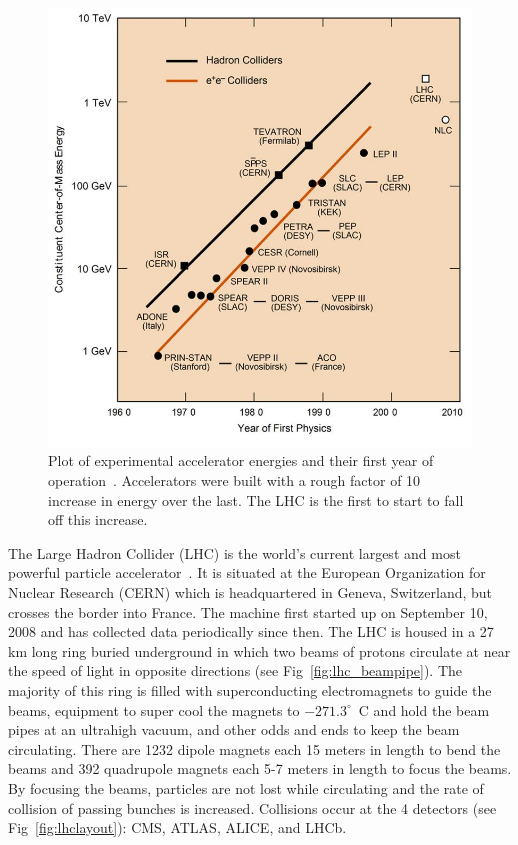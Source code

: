 		\begin{figure}[h]
		\begin{center}
\includegraphics[width=0.8\linewidth]{Figs/collider_energy.jpg}
\end{center}
\caption{\label{fig:experiment_energies}
Plot of experimental accelerator energies and their first year of operation~\cite{comenergy}. Accelerators were built with a rough factor of 10 increase in energy over the last. The LHC is the first to start to fall off this increase.
}
\end{figure} 
	
	The Large Hadron Collider (LHC) is the world's current largest and most powerful particle accelerator~\cite{cernlhc}. It is situated at the European Organization for Nuclear Research (CERN) which is headquartered in Geneva, Switzerland, but crosses the border into France. The machine first started up on September 10, 2008 and has collected data periodically since then. The LHC is housed in a 27 km long ring buried underground in which two beams of protons circulate at near the speed of light in opposite directions (see Fig~\ref{fig:lhc_beampipe}). The majority of this ring is filled with superconducting electromagnets to guide the beams, equipment to super cool the magnets to $-271.3^\circ$~C and hold the beam pipes at an ultrahigh vacuum, and other odds and ends to keep the beam circulating. There are 1232 dipole magnets each 15 meters in length to bend the beams and 392 quadrupole magnets  each 5-7 meters in length to focus the beams. By focusing the beams, particles are not lost while circulating and the rate of collision of passing bunches is increased. Collisions occur at the 4 detectors (see Fig~\ref{fig:lhclayout}): CMS, ATLAS, ALICE, and LHCb.
	
